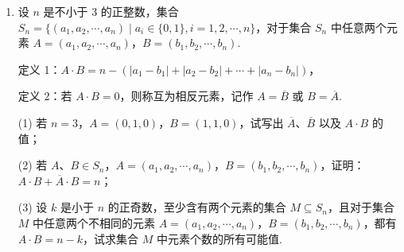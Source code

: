 \documentclass[a4paper,11pt]{article}
\begin{document}
\begin{enumerate}
\solend
\fi

\item 设 $n$ 是不小于 $3$ 的正整数，集合 $S_n=\{(a_1,a_2,\cdots,a_n)\mid a_i\in\{0,1\},i=1,2,\cdots,n\}$，对于集合 $S_n$ 中任意两个元素 $A=(a_1,a_2,\cdots,a_n)$，$B=(b_1,b_2,\cdots,b_n)$.

定义 1：$A\cdot B=n-(\lvert a_1-b_1\rvert+\lvert a_2-b_2\rvert+\cdots+\lvert a_n-b_n\rvert)$，

定义 2：若 $A\cdot B=0$，则称互为相反元素，记作 $A=\overline B$ 或 $B=\overline A$.

(1) 若 $n=3$，$A=(0,1,0)$，$B=(1,1,0)$，试写出 $\overline A$、$\overline B$ 以及 $A\cdot B$ 的值；

(2) 若 $A$、$B\in S_n$，$A=(a_1,a_2,\cdots,a_n)$，$B=(b_1,b_2,\cdots,b_n)$，证明：$A\cdot B+\overline A\cdot B=n$；

(3) 设 $k$ 是小于 $n$ 的正奇数，至少含有两个元素的集合 $M\subseteq S_n$，且对于集合 $M$ 中任意两个不相同的元素 $A=(a_1,a_2,\cdots,a_n)$，$B=(b_1,b_2,\cdots,b_n)$，都有 $A\cdot B=n-k$，试求集合 $M$ 中元素个数的所有可能值.


\end{enumerate}
\end{document}

